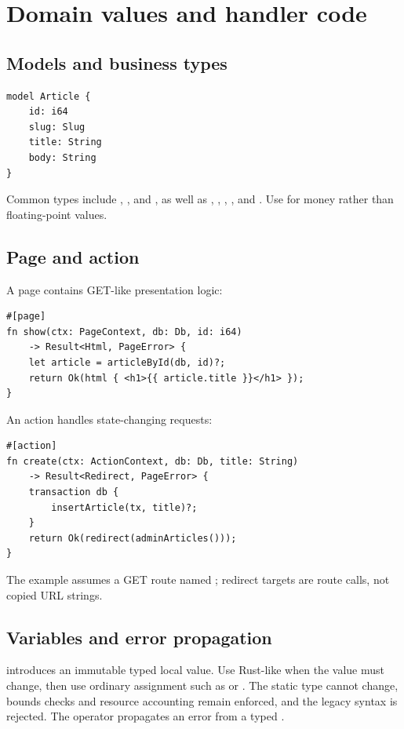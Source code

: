 \section{Domain values and handler code}

\subsection*{Models and business types}

\begin{lstlisting}[language=Velran]
model Article {
    id: i64
    slug: Slug
    title: String
    body: String
}
\end{lstlisting}

Common types include , , and , as well as , , , , and . Use  for money rather than floating-point values.

\subsection*{Page and action}

A page contains GET-like presentation logic:

\begin{lstlisting}[language=Velran]
#[page]
fn show(ctx: PageContext, db: Db, id: i64)
    -> Result<Html, PageError> {
    let article = articleById(db, id)?;
    return Ok(html { <h1>{{ article.title }}</h1> });
}
\end{lstlisting}

An action handles state-changing requests:

\begin{lstlisting}[language=Velran]
#[action]
fn create(ctx: ActionContext, db: Db, title: String)
    -> Result<Redirect, PageError> {
    transaction db {
        insertArticle(tx, title)?;
    }
    return Ok(redirect(adminArticles()));
}
\end{lstlisting}

The example assumes a GET route named ; redirect targets are route calls, not copied URL strings.

\subsection*{Variables and error propagation}

 introduces an immutable typed local value. Use Rust-like  when the value must change, then use ordinary assignment such as  or . The static type cannot change, bounds checks and resource accounting remain enforced, and the legacy  syntax is rejected. The  operator propagates an error from a typed .

